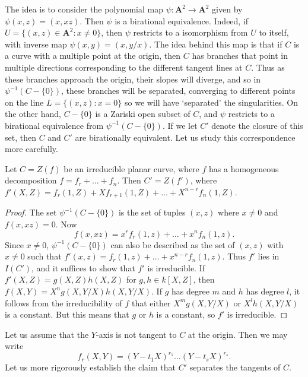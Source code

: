The idea is to consider the polynomial map $\psi: \mathbf{A}^2 \to \mathbf{A}^2$ given by $\psi(x,z) = (x,xz)$. Then $\psi$ is a birational equivalence. Indeed, if $U = \{ (x,z) \in \mathbf{A}^2: x \neq 0 \}$, then $\psi$ restricts to a isomorphism from $U$ to itself, with inverse map $\psi(x,y) = (x,y/x)$. The idea behind this map is that if $C$ is a curve with a multiple point at the origin, then $C$ has branches that point in multiple directions corresponding to the different tangent lines at $C$. Thus as these branches approach the origin, their slopes will diverge, and so in $\psi^{-1}(C - \{ 0 \})$, these branches will be separated, converging to different points on the line $L = \{ (x,z) : x = 0 \}$ so we will have `separated' the singularities. On the other hand, $C - \{ 0 \}$ is a Zariski open subset of $C$, and $\psi$ restricts to a birational equivalence from $\psi^{-1}(C - \{ 0 \})$. If we let $C'$ denote the closure of this set, then $C$ and $C'$ are birationally equivalent. Let us study this correspondence more carefully.

\begin{lemma}
    Let $C = Z(f)$ be an irreducible planar curve, where $f$ has a homogeneous decomposition $f = f_r + \dots + f_n$. Then $C' = Z(f')$, where $f'(X,Z) = f_r(1,Z) + X f_{r+1}(1,Z) + \dots + X^{n-r} f_n(1,Z)$.
\end{lemma}
\begin{proof}
    The set $\psi^{-1}(C - \{ 0 \})$ is the set of tuples $(x,z)$ where $x \neq 0$ and $f(x,xz) = 0$. Now
    \[ f(x,xz) = x^r f_r(1,z) + \dots + x^n f_n(1,z). \]
    Since $x \neq 0$, $\psi^{-1}(C - \{ 0 \})$ can also be described as the set of $(x,z)$ with $x \neq 0$ such that $f'(x,z) = f_r(1,z) + \dots + x^{n-r} f_n(1,z)$. Thus $f'$ lies in $I(C')$, and it suffices to show that $f'$ is irreducible. If $f'(X,Z) = g(X,Z)h(X,Z)$ for $g,h \in k[X,Z]$, then $f(X,Y) = X^n g(X,Y/X)h(X,Y/X)$. If $g$ has degree $m$ and $h$ has degree $l$, it follows from the irreducibility of $f$ that either $X^m g(X,Y/X)$ or $X^l h(X,Y/X)$ is a constant. But this means that $g$ or $h$ is a constant, so $f'$ is irreducible.
\end{proof}

Let us assume that the $Y$-axis is not tangent to $C$ at the origin. Then we may write
%
\[ f_r(X,Y) = (Y - t_1 X)^{r_1} \dots (Y - t_s X)^{r_s}. \]
%
Let us more rigorously establish the claim that $C'$ separates the tangents of $C$.

